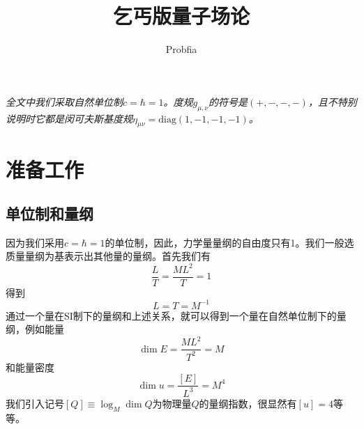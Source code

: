 \documentclass[a4paper,11pt]{ctexart}
\title{乞丐版量子场论}
\author{Probfia}
\date{}
\newcommand{\beq}{\begin{equation}}
\newcommand{\eeq}{\end{equation}}
\newcommand{\diag}{\mathrm{diag}}
\begin{document}
\maketitle
\tableofcontents
\vspace{5mm}
\emph{
全文中我们采取自然单位制$c = \hbar = 1$。度规$g_{\mu,\nu}$的符号是$(+,-,-,-)$，且不特别说明时它都是闵可夫斯基度规$\eta_{\mu \nu} = \diag (1,-1,-1,-1)$。
}
\section{准备工作}
\subsection{单位制和量纲}
因为我们采用$c = \hbar = 1$的单位制，因此，力学量量纲的自由度只有1。我们一般选质量量纲为基表示出其他量的量纲。首先我们有
\beq
\frac{L}{T} = \frac{ML^2}{T} = 1
\eeq
得到
\beq
L = T = M^{-1}
\eeq
通过一个量在SI制下的量纲和上述关系，就可以得到一个量在自然单位制下的量纲，例如能量
\beq
\dim E = \frac{ML^2}{T^2} = M
\eeq
和能量密度
\beq
\dim u = \frac{[E]}{L^3} = M^4
\eeq
我们引入记号$[Q] \equiv \log_M \dim Q$为物理量$Q$的量纲指数，很显然有$[u] = 4$等等。
\end{document}
